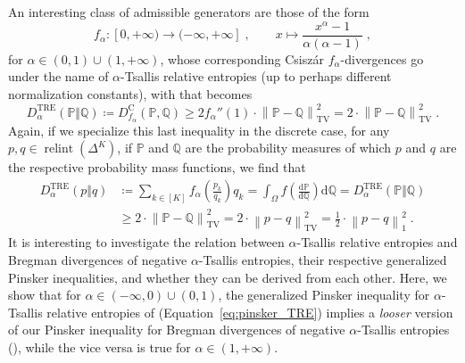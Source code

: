 \documentclass[11pt,oneside,a4paper]{article}
\newcommand{\Pb}{\mathbb{P}}
\newcommand{\Q}{\mathbb{Q}}
\newcommand{\lrb}[1]{\left(#1\right)}
\newcommand{\lno}[1]{\left\lVert#1\right\rVert}
\newcommand{\dif}{\mathrm{d}}
\theoremstyle{plain}
\theoremstyle{definition}
\theoremstyle{remark}
\newcommand{\simplex}[1]{\Delta^{#1}}
\DeclareMathOperator*{\relint}{relint}
\newcommand{\TV}[2]{\lno{ #1 - #2 }_{\textrm{TV}} }
\begin{document}
{An interesting class of admissible generators are those of the form
\[
    f_\alpha \colon [0,+\infty) \to (-\infty,+\infty]\;,\qquad
    x\mapsto \frac{x^{\alpha}-1}{\alpha(\alpha-1)}\;,
\]
for $\alpha \in (0,1)\cup(1,+\infty)$, whose corresponding Csisz\'ar $f_\alpha$-divergences go under the name of $\alpha$-Tsallis relative entropies (up to perhaps different normalization constants), with  that becomes
\[
    D^{\textrm{TRE}}_\alpha(\Pb \Vert \Q)
\coloneqq
     D^{\textrm{C}}_{f_\alpha}(\Pb , \Q)
\ge
    2 f_\alpha '' (1) \cdot \TV{\Pb}{\Q}^2
=
    2\cdot \TV{\Pb}{\Q}^2\;.
\]
Again, if we specialize this last inequality in the discrete case, for any $p,q \in \relint\lrb{\simplex{K}}$, if $\Pb$ and $\Q$ are the probability measures of which $p$ and $q$ are the respective probability mass functions, we find that
\begin{align}
\label{eq:pinsker_TRE}
    D^{\textrm{TRE}}_\alpha(p \Vert q)
&\coloneqq
    \sum_{k \in [K]} f_\alpha\lrb{\frac{p_k}{q_k}}q_k
=
    \int_\Omega f\lrb{\frac{\dif \Pb}{\dif \Q}}\dif \Q
=
    D^{\textrm{TRE}}_\alpha(\Pb \Vert \Q)
\\
&\ge
    2 \cdot\TV{\Pb}{\Q}^2
=
    2 \cdot \TV{p}{q}^2
=
    \frac{1}{2} \cdot \lno{p-q}_1^2\;.\nonumber
\end{align}
It is interesting to investigate the relation between $\alpha$-Tsallis relative entropies and Bregman divergences of negative $\alpha$-Tsallis entropies, their respective generalized Pinsker inequalities, and whether they can be derived from each other.
Here, we show that for $\alpha \in (-\infty,0)\cup (0,1)$, the generalized Pinsker inequality for $\alpha$-Tsallis relative entropies of \cite{Gilardoni} (Equation~\ref{eq:pinsker_TRE}) implies a \emph{looser} version of our Pinsker inequality for Bregman divergences of negative $\alpha$-Tsallis entropies (), while the vice versa is true for $\alpha \in (1,+\infty)$.

}
\end{document}
